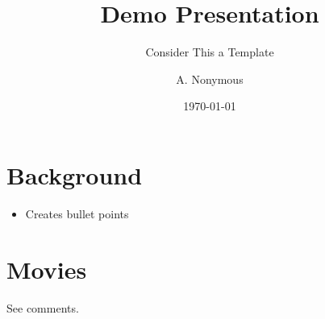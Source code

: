 \documentclass[11pt]{beamer}
\title{Demo Presentation}
\subtitle{Consider This a Template}
\date{\today}
\author{A. Nonymous}
\institute{Earth}
\begin{document}
\maketitle

\section{Background}%
\begin{frame}
  \begin{itemize}
    \item Creates bullet points
  \end{itemize}
\end{frame}

\section{Movies}
\begin{frame}%
  \centering
  \vfill
  \vfill
  See comments.
\end{frame}

\section{}
\end{document}
